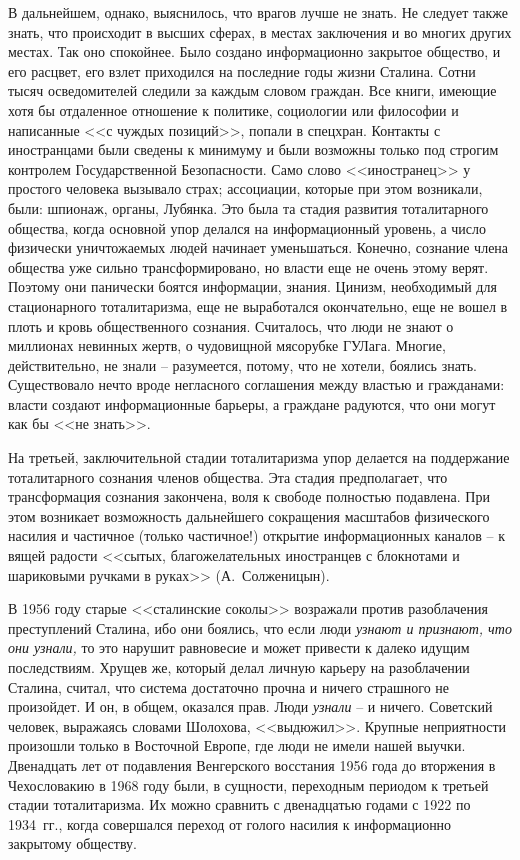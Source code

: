 \documentclass{book}
\begin{document}
В дальнейшем, однако, выяснилось, что врагов лучше не знать. Не следует также знать, что происходит в высших сферах, в местах заключения и во многих других местах. Так оно спокойнее. Было создано информационно закрытое общество, и его расцвет, его взлет приходился на последние годы жизни Сталина. Сотни тысяч осведомителей следили за каждым словом граждан. Все книги, имеющие хотя бы отдаленное отношение к политике, социологии или философии и написанные <<с чуждых позиций>>, попали в спецхран. Контакты с иностранцами были сведены к минимуму и были возможны только под строгим контролем Государственной Безопасности. Само слово <<иностранец>> у простого человека вызывало страх; ассоциации, которые при этом возникали, были: шпионаж, органы, Лубянка.
Это была та стадия развития тоталитарного общества, когда основной упор делался на информационный уровень, а число физически уничтожаемых людей начинает уменьшаться. Конечно, сознание члена общества уже сильно трансформировано, но власти еще не очень этому верят. Поэтому они панически боятся информации, знания.  Цинизм, необходимый для стационарного тоталитаризма, еще не выработался окончательно, еще не вошел в плоть и кровь общественного сознания. Считалось, что люди не знают о  миллионах невинных жертв, о чудовищной мясорубке ГУЛага. Многие, действительно, не знали -- разумеется, потому, что не хотели, боялись знать. Существовало нечто вроде негласного соглашения между властью и гражданами: власти создают информационные барьеры, а граждане радуются, что они могут как бы <<не знать>>.

На третьей, заключительной стадии тоталитаризма упор делается на поддержание тоталитарного сознания  членов об­щества. Эта стадия предполагает, что трансформация сознания закончена, воля к свободе полностью подавлена. При этом возникает возможность дальнейшего сокращения масштабов физического насилия и частичное (только частичное!) открытие информационных каналов -- к вящей радости <<сытых, благожелательных иностранцев с блокнотами и шариковыми ручками в руках>> (А.~Солженицын).

В 1956 году старые <<сталинские соколы>> возражали про­тив разоблачения преступлений Сталина, ибо они боялись, что если люди \textit{узнают и признают, что они узнали,}  то это нарушит равновесие и может привести к далеко идущим последствиям. Хрущев же, который делал личную карьеру на разоблачении Сталина, считал, что система достаточно прочна и ничего страшного не произойдет. И он, в общем, оказался прав. Люди \textit{узнали} -- и  ничего. Советский человек, выражаясь словами Шолохова, <<выдюжил>>. Крупные неприятности произошли только в Восточной Европе, где люди не имели нашей выучки. Двенадцать лет от подавления Венгерского восстания 1956 года до вторжения в Чехословакию в 1968 году были, в сущности, переходным периодом к третьей стадии тоталитаризма. Их можно сравнить с двенадцатью годами с 1922 по 1934~гг., ко­гда совершался переход от голого насилия к информационно закрытому обществу.
\end{document}
